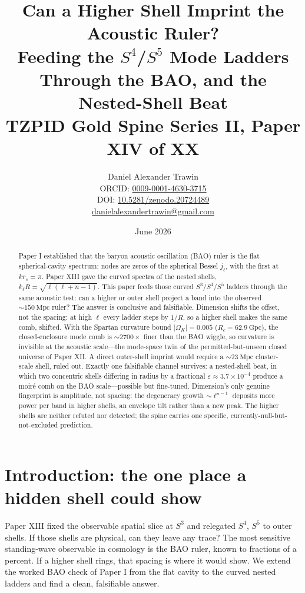 \documentclass[11pt]{article}
\title{Can a Higher Shell Imprint the Acoustic Ruler?\\ Feeding the $S^4$/$S^5$ Mode Ladders Through the BAO, and the Nested-Shell Beat\\[0.6em]
\large TZPID Gold Spine Series II, Paper XIV of XX}
\author{Daniel Alexander Trawin\\
\small ORCID: \href{https://orcid.org/0009-0001-4630-3715}{0009-0001-4630-3715}\\
\small DOI: \href{https://doi.org/10.5281/zenodo.20724489}{10.5281/zenodo.20724489}\\
\small \href{mailto:danielalexandertrawin@gmail.com}{danielalexandertrawin@gmail.com}}
\date{June 2026}
\theoremstyle{remark}
\newcommand{\Mpc}{\mathrm{Mpc}}
\newcommand{\Gpc}{\mathrm{Gpc}}
\newcommand{\OmK}{\Omega_K}
\begin{document}
\maketitle
\begin{abstract}
Paper I established that the baryon acoustic oscillation (BAO) ruler is the flat spherical-cavity spectrum: nodes are zeros of the spherical Bessel $j_\ell$, with the first at $k r_s = \pi$. Paper XIII gave the curved spectra of the nested shells, $k_\ell R = \sqrt{\ell(\ell+n-1)}$. This paper feeds those curved $S^3$/$S^4$/$S^5$ ladders through the same acoustic test: can a higher or outer shell project a band into the observed $\sim 150\ \Mpc$ ruler? The answer is conclusive and falsifiable. Dimension shifts the offset, not the spacing: at high $\ell$ every ladder steps by $1/R$, so a higher shell makes the same comb, shifted. With the Spartan curvature bound $|\OmK| = 0.005$ ($R_c = 62.9\ \Gpc$), the closed-enclosure mode comb is $\sim 2700\times$ finer than the BAO wiggle, so curvature is invisible at the acoustic scale---the mode-space twin of the permitted-but-unseen closed universe of Paper XII. A direct outer-shell imprint would require a $\sim 23\ \Mpc$ cluster-scale shell, ruled out. Exactly one falsifiable channel survives: a nested-shell beat, in which two concentric shells differing in radius by a fractional $\varepsilon \approx 3.7\times10^{-4}$ produce a moir\'e comb on the BAO scale---possible but fine-tuned. Dimension's only genuine fingerprint is amplitude, not spacing: the degeneracy growth $\sim \ell^{n-1}$ deposits more power per band in higher shells, an envelope tilt rather than a new peak. The higher shells are neither refuted nor detected; the spine carries one specific, currently-null-but-not-excluded prediction.
\end{abstract}
\section{Introduction: the one place a hidden shell could show}
Paper XIII fixed the observable spatial slice at $S^3$ and relegated $S^4$, $S^5$ to outer shells. If those shells are physical, can they leave any trace? The most sensitive standing-wave observable in cosmology is the BAO ruler, known to fractions of a percent. If a higher shell rings, that spacing is where it would show. We extend the worked BAO check of Paper I from the flat cavity to the curved nested ladders and find a clean, falsifiable answer.
\end{document}
